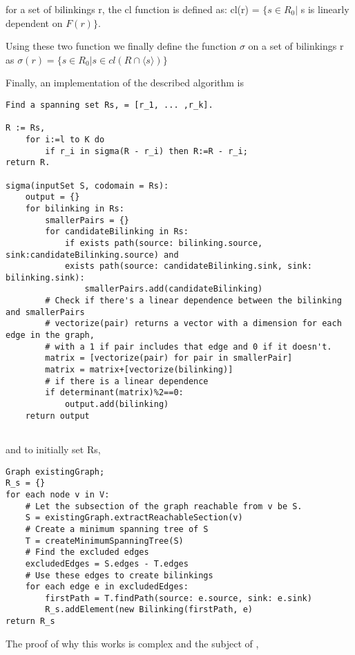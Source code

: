 \documentclass{article}
\begin{document}
for a set of bilinkings r, the cl function is defined as:
cl(r) = $\{ s\in R_0|$ s is linearly dependent on $F(r) \}$.

Using these two function we finally define the function $\sigma$ on a set of bilinkings r as
$\sigma(r) = \{s \in R_0 | s\in cl(R\cap \langle s \rangle) \}$

Finally, an implementation of the described algorithm is

\begin{verbatim}
Find a spanning set Rs, = [r_1, ... ,r_k].

R := Rs,
    for i:=l to K do
        if r_i in sigma(R - r_i) then R:=R - r_i;
return R.

sigma(inputSet S, codomain = Rs):
    output = {}
    for bilinking in Rs:
        smallerPairs = {}
        for candidateBilinking in Rs:
            if exists path(source: bilinking.source, sink:candidateBilinking.source) and
            exists path(source: candidateBilinking.sink, sink: bilinking.sink):
                smallerPairs.add(candidateBilinking)
        # Check if there's a linear dependence between the bilinking and smallerPairs
        # vectorize(pair) returns a vector with a dimension for each edge in the graph,
        # with a 1 if pair includes that edge and 0 if it doesn't.
        matrix = [vectorize(pair) for pair in smallerPair]
        matrix = matrix+[vectorize(bilinking)]
        # if there is a linear dependence
        if determinant(matrix)%2==0:
            output.add(bilinking)
    return output
                
\end{verbatim}

and to initially set Rs,

\begin{verbatim}
Graph existingGraph;
R_s = {}
for each node v in V:
    # Let the subsection of the graph reachable from v be S.
    S = existingGraph.extractReachableSection(v)
    # Create a minimum spanning tree of S
    T = createMinimumSpanningTree(S)
    # Find the excluded edges
    excludedEdges = S.edges - T.edges
    # Use these edges to create bilinkings
    for each edge e in excludedEdges:
        firstPath = T.findPath(source: e.source, sink: e.sink)
        R_s.addElement(new Bilinking(firstPath, e)
return R_s
\end{verbatim}

The proof of why this works is complex and the subject of \cite{commutative}, 
\end{document}

